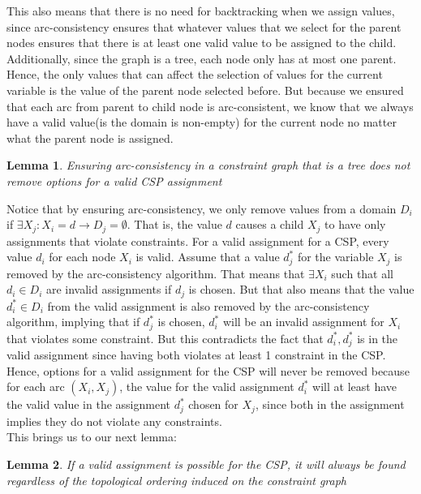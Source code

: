 \documentclass[12pt]{article}
\newtheorem{lemma}{Lemma}
\begin{document}
This also means that there is no need for backtracking when we assign values, since arc-consistency ensures that whatever values that we select for the parent nodes ensures that there is at least one valid value to be assigned to the child. Additionally, since the graph is a tree, each node only has at most one parent. Hence, the only values that can affect the selection of values for the current variable is the value of the parent node selected before. But because we ensured that each arc from parent to child node is arc-consistent, we know that we always have a valid value(is the domain is non-empty) for the current node no matter what the parent node is assigned. 

\begin{lemma}
Ensuring arc-consistency in a constraint graph that is a tree does not remove options for a valid CSP assignment
\end{lemma}

Notice that by ensuring arc-consistency, we only remove values from a domain $D_i$ if $\exists X_j : X_i = d \rightarrow D_j = \emptyset$.  That is, the value $d$ causes a child $X_j$ to have only assignments that violate constraints. For a valid assignment for a CSP, every value $d_i$ for each node $X_i$ is valid. Assume that a value $d^*_j$ for the variable $X_j$ is removed by the arc-consistency algorithm. That means that $\exists X_i$ such that all $d_i \in D_i$ are invalid assignments if $d_j$ is chosen.  But that also means that the value $d^*_i \in D_i$ from the valid assignment is also removed by the arc-consistency algorithm, implying that if $d^*_j$ is chosen, $d^*_i$ will be an invalid assignment for $X_i$ that violates some constraint. But this contradicts the fact that $d^*_i, d^*_j$ is in the valid assignment since having both violates at least 1 constraint in the CSP. Hence, options for a valid assignment for the CSP will never be removed because for each arc $(X_i, X_j)$, the value for the valid assignment $d^*_i$ will at least have the valid value in the assignment $d^*_j$ chosen for $X_j$, since both in the assignment implies they do not violate any constraints.\\

This brings us to our next lemma:

\begin{lemma}
If a valid assignment is possible for the CSP, it will always be found regardless of the topological ordering induced on the constraint graph
\end{lemma}
\end{document}
